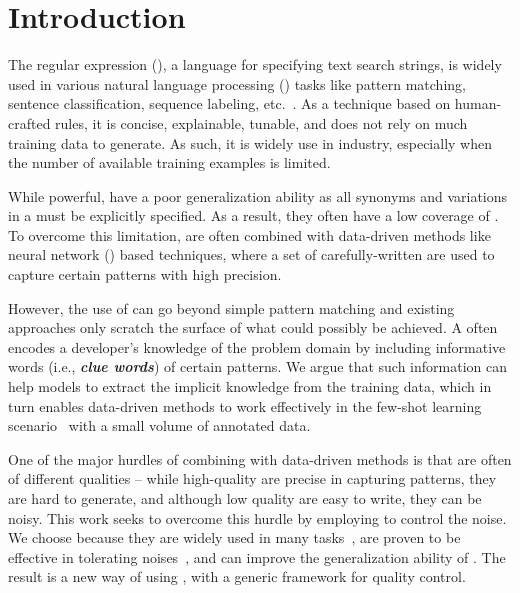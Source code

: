 \section{Introduction}


The regular expression (\RE), a language for specifying text search strings, is widely used in various natural language processing (\NLP)
tasks like pattern matching, sentence classification, sequence labeling, etc.~\cite{chang2014tokensregex}.
As a technique based on human-crafted rules, it is concise, explainable, tunable, and does not rely on much training data to generate. As
such, it is widely use in industry, especially when the number of available training examples is limited.

While powerful, \REs have a poor generalization ability as all synonyms and variations in a \RE must be explicitly specified. As a result,
they often have a low coverage of . To overcome this limitation, \REs are often combined with data-driven methods like neural network
(\NN) based techniques, where a set of carefully-written \REs are used to capture certain patterns with high precision.

However, the use of \REs can go beyond simple pattern matching and existing approaches only scratch the surface of what could possibly be
achieved. A \RE often encodes a developer's knowledge of the problem domain by including informative words (i.e., \textbf{\textit{clue
words}}) of certain patterns. We argue that such information can help models to extract the implicit knowledge from the training data,
which in turn enables data-driven methods to work effectively in the few-shot learning scenario~\cite{gc2015big} with a small volume of
annotated data.


One of the major hurdles of combining \REs with data-driven methods is that \REs are often of different qualities -- while high-quality
\REs are precise in capturing patterns, they are hard to generate, and although low quality \REs are easy to write, they can be noisy. This
work seeks to overcome this hurdle by employing \NNs to control the noise. We choose \NNs because they are widely used in many \NLP
tasks~\cite{goldberg2017neural}, are proven to be effective in tolerating noises~\cite{xie2016disturblabel}, and can improve the
generalization ability of \REs. The result is a new way of using \REs, with a generic framework for quality control.

